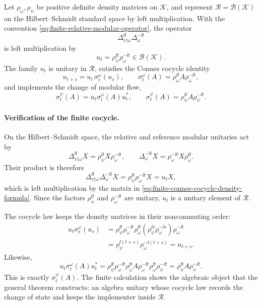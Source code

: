 \begin{example}
\label{ex:finite-standard-form-connes-cocycle}
Let \(\rho_\omega,\rho_\psi\) be positive definite density matrices on
\(\mathcal K\), and represent
\(\mathcal R=\mathcal B(\mathcal K)\) on the Hilbert--Schmidt standard
space by left multiplication.  With the convention
\eqref{eq:finite-relative-modular-operator}, the operator
\[
  \Delta_{\psi|\omega}^{\ii t}\Delta_\omega^{-\ii t}
\]
is left multiplication by
\begin{equation}
  u_t=\rho_\psi^{\ii t}\rho_\omega^{-\ii t}\in\mathcal B(\mathcal K).
  \label{eq:finite-connes-cocycle-density-formula}
\end{equation}
The family \(u_t\) is unitary in \(\mathcal R\), satisfies the Connes
cocycle identity
\[
  u_{t+s}=u_t\,\sigma_t^\omega(u_s),
  \qquad
  \sigma_t^\omega(A)=\rho_\omega^{\ii t}A\rho_\omega^{-\ii t},
\]
and implements the change of modular flow,
\[
  \sigma_t^\psi(A)=u_t\sigma_t^\omega(A)u_t^*,
  \qquad
  \sigma_t^\psi(A)=\rho_\psi^{\ii t}A\rho_\psi^{-\ii t}.
\]
\end{example}

\paragraph{Verification of the finite cocycle.}
On the Hilbert--Schmidt space, the relative and reference modular unitaries
act by
\[
  \Delta_{\psi|\omega}^{\ii t}X
  =
  \rho_\psi^{\ii t}X\rho_\omega^{-\ii t},
  \qquad
  \Delta_\omega^{-\ii t}X
  =
  \rho_\omega^{-\ii t}X\rho_\omega^{\ii t}.
\]
Their product is therefore
\[
  \Delta_{\psi|\omega}^{\ii t}\Delta_\omega^{-\ii t}X
  =
  \rho_\psi^{\ii t}\rho_\omega^{-\ii t}X
  =
  u_tX,
\]
which is left multiplication by the matrix in
\eqref{eq:finite-connes-cocycle-density-formula}.  Since the factors
\(\rho_\psi^{\ii t}\) and \(\rho_\omega^{-\ii t}\) are unitary, \(u_t\) is a
unitary element of \(\mathcal R\).

The cocycle law keeps the density matrices in their noncommuting order:
\[
\begin{aligned}
  u_t\sigma_t^\omega(u_s)
  &=
  \rho_\psi^{\ii t}\rho_\omega^{-\ii t}
  \rho_\omega^{\ii t}
  (\rho_\psi^{\ii s}\rho_\omega^{-\ii s})
  \rho_\omega^{-\ii t}  \\
  &=
  \rho_\psi^{\ii(t+s)}\rho_\omega^{-\ii(t+s)}
  =
  u_{t+s}.
\end{aligned}
\]
Likewise,
\[
  u_t\sigma_t^\omega(A)u_t^*
  =
  \rho_\psi^{\ii t}\rho_\omega^{-\ii t}
  \rho_\omega^{\ii t}A\rho_\omega^{-\ii t}
  \rho_\omega^{\ii t}\rho_\psi^{-\ii t}
  =
  \rho_\psi^{\ii t}A\rho_\psi^{-\ii t}.
\]
This is exactly \(\sigma_t^\psi(A)\).  The finite calculation shows the
algebraic object that the general theorem constructs: an algebra unitary
whose cocycle law records the change of state and keeps the implementer
inside \(\mathcal R\).

